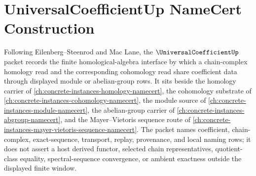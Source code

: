 \chapter{UniversalCoefficientUp NameCert Construction}
\label{ch:concrete-instances-universal-coefficient-namecert}

Following Eilenberg--Steenrod and Mac Lane, the $\UniversalCoefficientUp$ packet records the finite homological-algebra interface by which a chain-complex homology read and the corresponding cohomology read share coefficient data through displayed module or abelian-group rows. It sits beside the homology carrier of \autoref{ch:concrete-instances-homology-namecert}, the cohomology substrate of \autoref{ch:concrete-instances-cohomology-namecert}, the module source of \autoref{ch:concrete-instances-module-namecert}, the abelian-group carrier of \autoref{ch:concrete-instances-abgroup-namecert}, and the Mayer--Vietoris sequence route of \autoref{ch:concrete-instances-mayer-vietoris-sequence-namecert}. The packet names coefficient, chain-complex, exact-sequence, transport, replay, provenance, and local naming rows; it does not assert a host derived functor, selected chain representatives, quotient-class equality, spectral-sequence convergence, or ambient exactness outside the displayed finite window.

